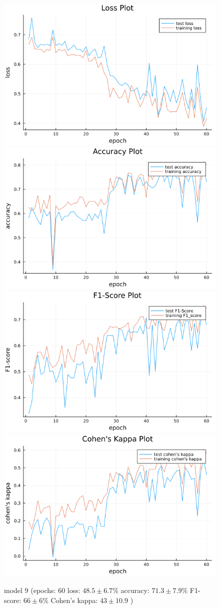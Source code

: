 \documentclass[
a4paper, 
12pt,
grayscalebody, %
abstract=on,
twoside, BCOR10mm, 12pt, DIV13,headinclude, footexclude, final, abstracton, openright
]{ibireprt}
\numberwithin{equation}{chapter}
\numberwithin{table}{chapter}
\numberwithin{figure}{chapter}
\numberwithin{algorithm}{chapter}
\numberwithin{example}{chapter}
\numberwithin{example}{chapter}
\begin{document}
\begin{figure}[h]
	\includegraphics[width=0.4\linewidth]{loss_png_final_3_1.png}\hfill
	\includegraphics[width=0.4\linewidth]{accuracy_png_final_3_1.png}
	\\[\smallskipamount]
	\includegraphics[width=0.4\linewidth]{f1_score_png_final_3_1.png}\hfill
	\includegraphics[width=0.4\linewidth]{cohens_kappa_png_final_3_1.png}
	\caption{model 9 (epochs: 60 loss: $48.5\pm6.7\% $ accuracy: $71.3\pm7.9\%$ F1-score: $66\pm6\%$  Cohen's kappa: $43\pm10.9$ )}
	\label{fig:model_9_60}
\end{figure}
\end{document}
